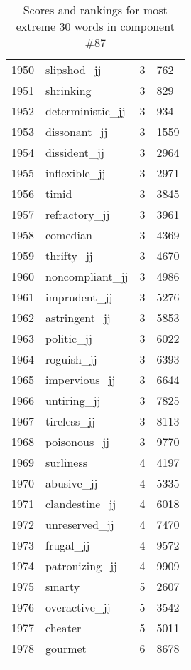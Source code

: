 \begin{longtable}[!htbp]{| rlr@{.}l |}
    1950 & slipshod\_jj & 3 & 762 \\
    1951 & shrinking & 3 & 829 \\
    1952 & deterministic\_jj & 3 & 934 \\
    1953 & dissonant\_jj & 3 & 1559 \\
    1954 & dissident\_jj & 3 & 2964 \\
    1955 & inflexible\_jj & 3 & 2971 \\
    1956 & timid & 3 & 3845 \\
    1957 & refractory\_jj & 3 & 3961 \\
    1958 & comedian & 3 & 4369 \\
    1959 & thrifty\_jj & 3 & 4670 \\
    1960 & noncompliant\_jj & 3 & 4986 \\
    1961 & imprudent\_jj & 3 & 5276 \\
    1962 & astringent\_jj & 3 & 5853 \\
    1963 & politic\_jj & 3 & 6022 \\
    1964 & roguish\_jj & 3 & 6393 \\
    1965 & impervious\_jj & 3 & 6644 \\
    1966 & untiring\_jj & 3 & 7825 \\
    1967 & tireless\_jj & 3 & 8113 \\
    1968 & poisonous\_jj & 3 & 9770 \\
    1969 & surliness & 4 & 4197 \\
    1970 & abusive\_jj & 4 & 5335 \\
    1971 & clandestine\_jj & 4 & 6018 \\
    1972 & unreserved\_jj & 4 & 7470 \\
    1973 & frugal\_jj & 4 & 9572 \\
    1974 & patronizing\_jj & 4 & 9909 \\
    1975 & smarty & 5 & 2607 \\
    1976 & overactive\_jj & 5 & 3542 \\
    1977 & cheater & 5 & 5011 \\
    1978 & gourmet & 6 & 8678 \\
    \hline
    \caption{Scores and rankings for most extreme 30 words in component \#87} \\
\end{longtable}
